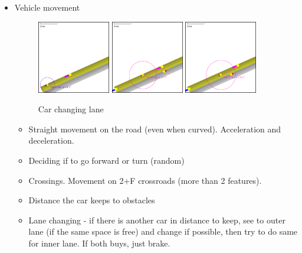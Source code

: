 \begin{itemize}
    \item Vehicle movement
        \begin{figure}[h]
            \caption{Car changing lane}
            \label{fig:carKeepingDistance}
            \centering
            \includegraphics[width=0.3\textwidth]{figs/carMovement/car_keeping_distance_to_other.png}
            \hspace{0.2em}
            \includegraphics[width=0.3\textwidth]{figs/carMovement/car_lane_change_before.png}
            \hspace{0.2em}
            \includegraphics[width=0.3\textwidth]{figs/carMovement/car_lane_change_after.png}
        \end{figure}

    \begin{itemize}
        \item Straight movement on the road (even when curved). Acceleration and deceleration.
        \item Deciding if to go forward or turn (random)
        \item Crossings. Movement on 2+F crossroads (more than 2 features).
        \item Distance the car keeps to obstacles
        \item Lane changing - if there is another car in distance to keep, see to outer lane (if the same space is free) and change if possible, then try to do same for inner lane. If both buys, just brake.
    \end{itemize}

\end{itemize}


